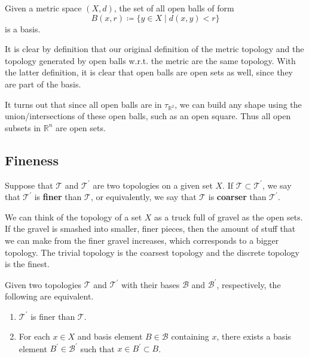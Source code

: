     \begin{theorem} 
      Given a metric space $(X, d)$, the set of all open balls of form 
      \begin{equation}
        B(x, r) \coloneqq \{y \in X \mid d(x, y) < r \}
      \end{equation} 
      is a basis. 
    \end{theorem} 

    It is clear by definition that our original definition of the metric topology and the topology generated by open balls w.r.t. the metric are the same topology. With the latter definition, it is clear that open balls are open sets as well, since they are part of the basis.  

    It turns out that since all open balls are in $\tau_{\mathbb{R}^{2}}$, we can build any shape using the union/intersections of these open balls, such as an open square. Thus all open subsets in $\mathbb{R}^{n}$ are open sets. 

  \subsection{Fineness}

      \begin{definition}
        Suppose that $\mathscr{T}$ and $\mathscr{T}^\prime$ are two topologies on a given set $X$. If $\mathscr{T} \subset \mathscr{T}^\prime$, we say that $\mathscr{T}^\prime$ is \textbf{finer} than $\mathscr{T}$, or equivalently, we say that $\mathscr{T}$ is \textbf{coarser} than $\mathscr{T}^\prime$. 
      \end{definition}

      We can think of the topology of a set $X$ as a truck full of gravel as the open sets. If the gravel is smashed into smaller, finer pieces, then the amount of stuff that we can make from the finer gravel increases, which corresponds to a bigger topology. The trivial topology is the coarsest topology and the discrete topology is the finest. 

      \begin{lemma}
        Given two topologies $\mathscr{T}$ and $\mathscr{T}^\prime$ with their bases $\mathscr{B}$ and $\mathscr{B}^\prime$, respectively, the following are equivalent. 
        \begin{enumerate}
          \item $\mathscr{T}^\prime$ is finer than $\mathscr{T}$. 
          \item For each $x \in X$ and basis element $B \in \mathscr{B}$ containing $x$, there exists a basis element $B^\prime \in \mathscr{B}^\prime$ such that $x \in B^\prime \subset B$. 
        \end{enumerate}
      \end{lemma}

